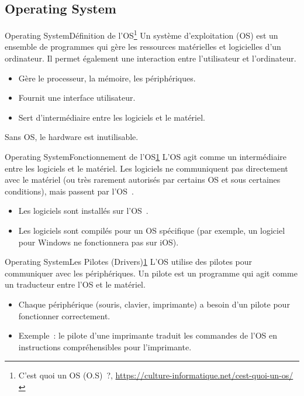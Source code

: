 \documentclass{beamer}
\begin{document}
    \subsection{Operating System}\label{subsec:os}

    \begin{frame}{Operating System}{Définition de l'OS\footnote{\label{os}C’est quoi un OS (O.S)~?, \url{https://culture-informatique.net/cest-quoi-un-os/}}}
        Un système d'exploitation (OS) est un ensemble de programmes qui gère les ressources matérielles et logicielles d'un ordinateur.
        Il permet également une interaction entre l'utilisateur et l'ordinateur.
        \begin{itemize}
            \item Gère le processeur, la mémoire, les périphériques.
            \item Fournit une interface utilisateur.
            \item Sert d'intermédiaire entre les logiciels et le matériel.
        \end{itemize}
        \bigbreak
        Sans OS, le hardware est inutilisable.
    \end{frame}

    \begin{frame}{Operating System}{Fonctionnement de l'OS\cref{os}}
        L'OS agit comme un intermédiaire entre les logiciels et le matériel.
        Les logiciels ne communiquent pas directement avec le matériel (ou très rarement autorisés par certains OS et sous certaines conditions), mais passent par l'OS~.
        \begin{itemize}
            \item Les logiciels sont installés sur l'OS~.
            \item Les logiciels sont compilés pour un OS spécifique (par exemple, un logiciel pour Windows ne fonctionnera pas sur iOS).
        \end{itemize}
    \end{frame}

    \begin{frame}{Operating System}{Les Pilotes (Drivers)\cref{os}}
        L'OS utilise des pilotes pour communiquer avec les périphériques.
        Un pilote est un programme qui agit comme un traducteur entre l'OS et le matériel.
        \begin{itemize}
            \item Chaque périphérique (souris, clavier, imprimante) a besoin d'un pilote pour fonctionner correctement.
            \item Exemple~: le pilote d'une imprimante traduit les commandes de l'OS en instructions compréhensibles pour l'imprimante.
        \end{itemize}
    \end{frame}
\end{document}
